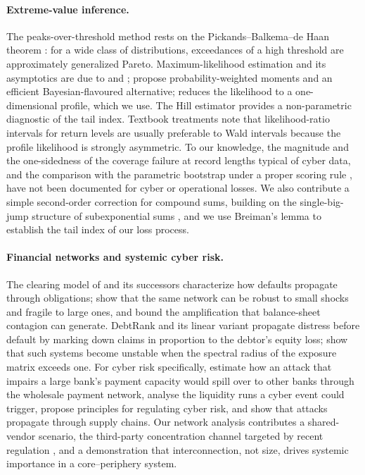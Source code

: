 \paragraph{Extreme-value inference.} The peaks-over-threshold method rests on the Pickands--Balkema--de Haan theorem \citep{balkema1974,pickands1975}: for a wide class of distributions, exceedances of a high threshold are approximately generalized Pareto. Maximum-likelihood estimation and its asymptotics are due to \citet{smith1987} and \citet{davison1990}; \citet{hosking1987} propose probability-weighted moments and \citet{zhang2009} an efficient Bayesian-flavoured alternative; \citet{grimshaw1993} reduces the likelihood to a one-dimensional profile, which we use. The Hill estimator \citep{hill1975} provides a non-parametric diagnostic of the tail index. Textbook treatments \citep{embrechts1997,coles2001,mcneil2015} note that likelihood-ratio intervals for return levels are usually preferable to Wald intervals because the profile likelihood is strongly asymmetric. To our knowledge, the magnitude and the one-sidedness of the coverage failure at record lengths typical of cyber data, and the comparison with the parametric bootstrap \citep{davison1997} under a proper scoring rule \citep{gneiting2007}, have not been documented for cyber or operational losses. We also contribute a simple second-order correction for compound sums, building on the single-big-jump structure of subexponential sums \citep{embrechts1997}, and we use Breiman's lemma \citep{breiman1965} to establish the tail index of our loss process.

\paragraph{Financial networks and systemic cyber risk.} The clearing model of \citet{eisenberg2001} and its successors characterize how defaults propagate through obligations; \citet{acemoglu2015} show that the same network can be robust to small shocks and fragile to large ones, and \citet{glasserman2015,glasserman2016} bound the amplification that balance-sheet contagion can generate. DebtRank \citep{battiston2012} and its linear variant \citep{bardoscia2015} propagate distress before default by marking down claims in proportion to the debtor's equity loss; \citet{bardoscia2017} show that such systems become unstable when the spectral radius of the exposure matrix exceeds one. For cyber risk specifically, \citet{eisenbach2022} estimate how an attack that impairs a large bank's payment capacity would spill over to other banks through the wholesale payment network, \citet{duffie2019} analyse the liquidity runs a cyber event could trigger, \citet{kashyap2019} propose principles for regulating cyber risk, and \citet{crosignani2023} show that attacks propagate through supply chains. Our network analysis contributes a shared-vendor scenario, the third-party concentration channel targeted by recent regulation \citep{dora2022}, and a demonstration that interconnection, not size, drives systemic importance in a core--periphery system.
